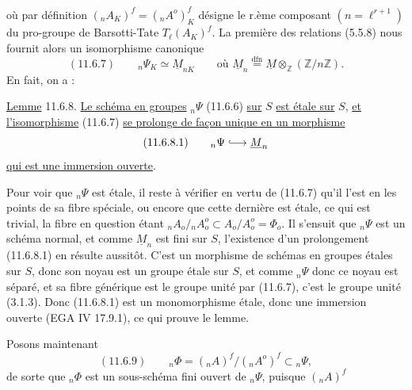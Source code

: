 
où par définition $({}_n A_K)^f=({}_n A^o)_K^f$ désigne le r.ème composant $(n=\ell^{r+1})$ du pro-groupe de Barsotti-Tate $T_\ell(A_K)^f$. La première des relations (5.5.8) nous fournit alors un isomorphisme canonique
\[
(11.6.7)\qquad {}_n\Psi_K\simeq\underline M_{nK}
\qquad\text{où }\underline M_n\overset{\mathrm{dfn}}=
\underline M\otimes_{\mathbb Z}(\mathbb Z/n\mathbb Z).
\]
En fait, on a :

\uline{Lemme} 11.6.8. \uline{Le schéma en groupes} $ {}_n\Psi$ (11.6.6) \uline{sur} $S$ \uline{est étale sur} $S$, \uline{et l'isomorphisme} (11.6.7) \uline{se prolonge de façon unique en un morphisme}
\[
(11.6.8.1)\qquad {}_n\Psi\lhook\joinrel\longrightarrow\underline M_n
\]
\uline{qui est une immersion ouverte}.

Pour voir que $ {}_n\Psi$ est étale, il reste à vérifier en vertu de (11.6.7) qu'il l'est en les points de sa fibre spéciale, ou encore que cette dernière est étale, ce qui est trivial, la fibre en question étant
$ {}_n A_o/{}_n A_o^o\subset A_o/A_o^o=\Phi_o$.
Il s'ensuit que $ {}_n\Psi$ est un schéma normal, et comme $\underline M_n$ est fini sur $S$, l'existence d'un prolongement (11.6.8.1) en résulte aussitôt. C'est un morphisme de schémas en groupes étales sur $S$, donc son noyau est un groupe étale sur $S$, et comme $ {}_n\Psi$ donc ce noyau est séparé, et sa fibre générique est le groupe unité par (11.6.7), c'est le groupe unité (3.1.3). Donc (11.6.8.1) est un monomorphisme étale, donc une immersion ouverte (EGA IV 17.9.1), ce qui prouve le lemme.

Posons maintenant
\[
(11.6.9)\qquad {}_n\Phi=({}_n A)^f/({}_n A^o)^f\subset{}_n\Psi,
\]
de sorte que $ {}_n\Phi$ est un sous-schéma fini ouvert de $ {}_n\Psi$, puisque $({}_n A)^f$

